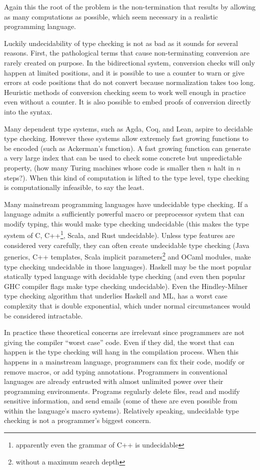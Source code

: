 Again this the root of the problem is the non-termination that results by allowing as many computations as possible, which seem necessary in a realistic programming language.

Luckily undecidability of type checking is not as bad as it sounds for several reasons.
First, the pathological terms that cause non-terminating conversion are rarely created on purpose.
In the bidirectional system, conversion checks will only happen at limited positions, and it is possible to use a counter to warn or give errors at code positions that do not convert because normalization takes too long.
Heuristic methods of conversion checking seem to work well enough in practice even without a counter.
It is also possible to embed proofs of conversion directly into the syntax\cite{sjoberg2012irrelevance}.

Many dependent type systems, such as Agda, Coq, and Lean, aspire to decidable type checking.
However these systems allow extremely fast growing functions to be encoded (such as Ackerman's function).
A fast growing function can generate a very large index that can be used to check some concrete but unpredictable property, (how many Turing machines whose code is smaller then $n$ halt in $n$ steps?).
When this kind of computation is lifted to the type level, type checking is computationally infeasible, to say the least.


Many mainstream programming languages have undecidable type checking.
If a language admits a sufficiently powerful macro or preprocessor system that can modify typing, this would make type checking undecidable (this makes the type system of C, C++\footnote{apparently even the grammar of C++ is undecidable}, Scala, and Rust undecidable).
Unless type features are considered very carefully, they can often create undecidable type checking (Java generics, C++ templates, Scala implicit parameters\footnote{without a maximum search depth} and OCaml modules, make type checking undecidable in those languages).
Haskell may be the most popular statically typed language with decidable type checking (and even then popular GHC compiler flags make type checking undecidable).
Even the Hindley-Milner type checking algorithm that underlies Haskell and ML, has a worst case complexity that is double exponential, which under normal circumstances would be considered intractable.

In practice these theoretical concerns are irrelevant since programmers are not giving the compiler ``worst case'' code.
Even if they did, the worst that can happen is the type checking will hang in the compilation process.
When this happens in a mainstream language, programmers can fix their code, modify or remove macros, or add typing annotations.
Programmers in conventional languages are already entrusted with almost unlimited power over their programming environments.
Programs regularly delete files, read and modify sensitive information, and send emails (some of these are even possible from within the language's macro systems).
Relatively speaking, undecidable type checking is not a programmer's biggest concern.

